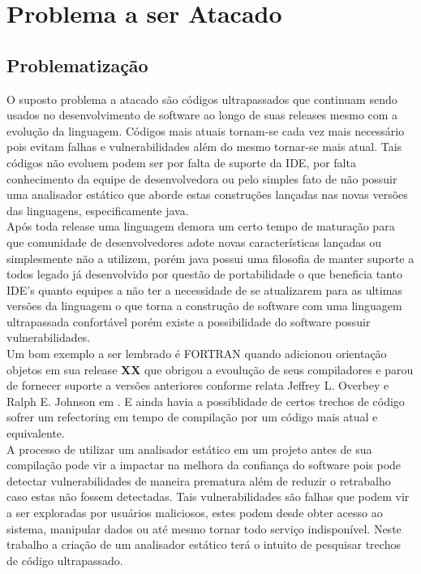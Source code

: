 \chapter{Problema a ser Atacado}
\section{Problematização}
O suposto problema a atacado são códigos ultrapassados que continuam sendo usados no desenvolvimento de software ao longo de suas releases mesmo com a evolução da linguagem. Códigos mais atuais tornam-se cada vez mais necessário pois evitam falhas e vulnerabilidades além do mesmo tornar-se mais atual. Tais códigos não evoluem podem ser por falta de suporte da IDE, por falta conhecimento da equipe de desenvolvedora ou pelo simples fato de não possuir uma analisador estático que aborde estas construções lançadas nas novas versões das linguagens, especificamente java.\\

Após toda release uma linguagem demora um certo tempo de maturação para que comunidade de desenvolvedores adote novas características lançadas ou simplesmente não a utilizem, porém java possui uma filosofia de manter suporte a todos legado já desenvolvido por questão de portabilidade o que beneficia tanto IDE's quanto equipes a não ter a necessidade de se atualizarem para as ultimas versões da linguagem o que torna a construção de software com uma linguagem ultrapassada confortável porém existe a possibilidade do software possuir vulnerabilidades.\\

Um bom exemplo a ser lembrado é FORTRAN quando adicionou orientação objetos em sua release \textbf{XX} que obrigou a evoulução de seus compiladores e parou de fornecer suporte a versões anteriores conforme relata Jeffrey L. Overbey e Ralph E. Johnson em \cite{Overbey:2009:RLR:1639949.1640127}. E ainda havia a possiblidade de certos trechos de código sofrer um refectoring em tempo de compilação por um código mais atual e equivalente.\\

A processo de utilizar um analisador estático em um projeto antes de sua compilação pode vir a impactar na melhora da confiança do software pois pode detectar vulnerabilidades de maneira prematura além de reduzir o retrabalho caso estas não fossem detectadas. Tais vulnerabilidades são falhas que podem vir a ser exploradas por usuários maliciosos, estes podem desde obter acesso ao sistema, manipular dados ou até mesmo tornar todo serviço indisponível. Neste trabalho a criação de um analisador estático terá o intuito de pesquisar trechos de código ultrapassado.\\

